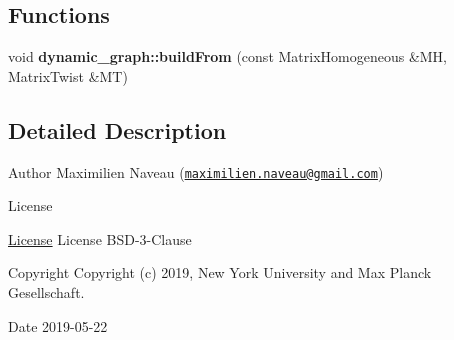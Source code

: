 \subsection*{Functions}
\begin{DoxyCompactItemize}
\item 
\mbox{\label{namespacedynamic__graph_a8023711282c3d038a68202b12d5279d6}} 
void {\bfseries dynamic\+\_\+graph\+::build\+From} (const Matrix\+Homogeneous \&MH, Matrix\+Twist \&MT)
\end{DoxyCompactItemize}


\subsection{Detailed Description}
\begin{DoxyAuthor}{Author}
Maximilien Naveau (\href{mailto:maximilien.naveau@gmail.com}{\tt maximilien.\+naveau@gmail.\+com}) 
\end{DoxyAuthor}
\begin{DoxyRefDesc}{License}
\item[\hyperlink{license__license000020}{License}]License B\+S\+D-\/3-\/\+Clause \end{DoxyRefDesc}
\begin{DoxyCopyright}{Copyright}
Copyright (c) 2019, New York University and Max Planck Gesellschaft. 
\end{DoxyCopyright}
\begin{DoxyDate}{Date}
2019-\/05-\/22 
\end{DoxyDate}
